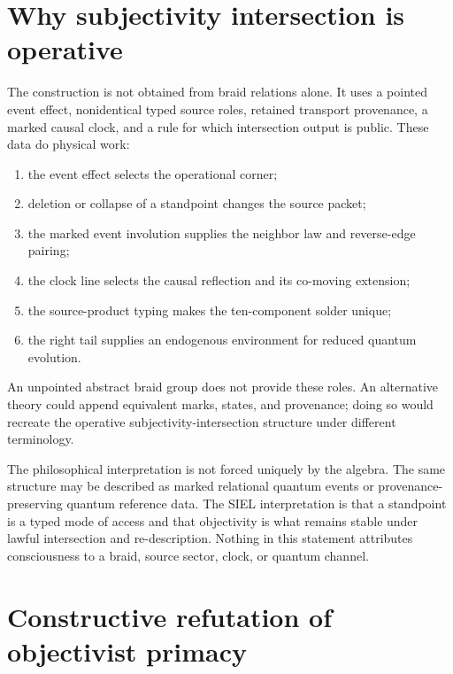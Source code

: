 \documentclass[11pt]{article}
\theoremstyle{definition}
\theoremstyle{remark}
\begin{document}
\section{Why subjectivity intersection is operative}

The construction is not obtained from braid relations alone. It uses a pointed event effect, nonidentical typed source roles, retained transport provenance, a marked causal clock, and a rule for which intersection output is public. These data do physical work:
\begin{enumerate}
\item the event effect selects the operational corner;
\item deletion or collapse of a standpoint changes the source packet;
\item the marked event involution supplies the neighbor law and reverse-edge pairing;
\item the clock line selects the causal reflection and its co-moving extension;
\item the source-product typing makes the ten-component solder unique;
\item the right tail supplies an endogenous environment for reduced quantum evolution.
\end{enumerate}
An unpointed abstract braid group does not provide these roles. An alternative theory could append equivalent marks, states, and provenance; doing so would recreate the operative subjectivity-intersection structure under different terminology.

The philosophical interpretation is not forced uniquely by the algebra. The same structure may be described as marked relational quantum events or provenance-preserving quantum reference data. The SIEL interpretation is that a standpoint is a typed mode of access and that objectivity is what remains stable under lawful intersection and re-description. Nothing in this statement attributes consciousness to a braid, source sector, clock, or quantum channel.

\section{Constructive refutation of objectivist primacy}
\end{document}
